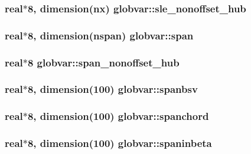 \subsubsection[{sle\+\_\+nonoffset\+\_\+hub}]{\setlength{\rightskip}{0pt plus 5cm}real$\ast$8, dimension({\bf nx}) globvar\+::sle\+\_\+nonoffset\+\_\+hub}\label{namespaceglobvar_a01ec65d098c5cf6f7396ff80126eb25e}
\hypertarget{namespaceglobvar_a5bd9849f460d93b2cb26f60fd2b04791}{}
\subsubsection[{span}]{\setlength{\rightskip}{0pt plus 5cm}real$\ast$8, dimension({\bf nspan}) globvar\+::span}\label{namespaceglobvar_a5bd9849f460d93b2cb26f60fd2b04791}
\hypertarget{namespaceglobvar_a6cfba7e55403bb754be3f594a4d00d32}{}
\subsubsection[{span\+\_\+nonoffset\+\_\+hub}]{\setlength{\rightskip}{0pt plus 5cm}real$\ast$8 globvar\+::span\+\_\+nonoffset\+\_\+hub}\label{namespaceglobvar_a6cfba7e55403bb754be3f594a4d00d32}
\hypertarget{namespaceglobvar_a6d99aeec6935f58b70f503a823d5f085}{}
\subsubsection[{spanbsv}]{\setlength{\rightskip}{0pt plus 5cm}real$\ast$8, dimension(100) globvar\+::spanbsv}\label{namespaceglobvar_a6d99aeec6935f58b70f503a823d5f085}
\hypertarget{namespaceglobvar_ad2c20e4194dda60c8e4a46ad62a24099}{}
\subsubsection[{spanchord}]{\setlength{\rightskip}{0pt plus 5cm}real$\ast$8, dimension(100) globvar\+::spanchord}\label{namespaceglobvar_ad2c20e4194dda60c8e4a46ad62a24099}
\hypertarget{namespaceglobvar_a9b67a74e3faac41a7e1cc636aa467efb}{}
\subsubsection[{spaninbeta}]{\setlength{\rightskip}{0pt plus 5cm}real$\ast$8, dimension(100) globvar\+::spaninbeta}\label{namespaceglobvar_a9b67a74e3faac41a7e1cc636aa467efb}
\hypertarget{namespaceglobvar_a9e37b92991bd90ec55563a14f0405156}{}
